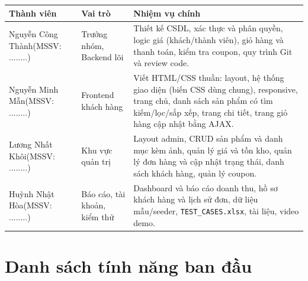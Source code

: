 \documentclass[12pt,a4paper]{article}   %
\newcommand{\MemberA}{Nguyễn Công Thành\newline (MSSV: ........)}
\newcommand{\MemberB}{Nguyễn Minh Mẫn\newline (MSSV: ........)}
\newcommand{\MemberC}{Lương Nhất Khôi\newline (MSSV: ........)}
\newcommand{\MemberD}{Huỳnh Nhật Hòa\newline (MSSV: ........)}
\begin{document}
\begin{tabularx}{\linewidth}{|L{3.3cm}|L{2.7cm}|Y|}
\hline
{} \textbf{Thành viên} & \textbf{Vai trò} & \textbf{Nhiệm vụ chính} \\ \hline \endhead
\MemberA & Trưởng nhóm, Backend lõi & Thiết kế CSDL, xác thực và phân quyền, logic giá (khách/thành viên),
          giỏ hàng và thanh toán, kiểm tra coupon, quy trình Git và review code. \\ \hline
\MemberB & Frontend khách hàng & Viết HTML/CSS thuần: layout, hệ thống giao diện (biến CSS dùng chung),
          responsive, trang chủ, danh sách sản phẩm có
          tìm kiếm/lọc/sắp xếp, trang chi tiết, trang giỏ hàng cập nhật bằng AJAX. \\ \hline
\MemberC & Khu vực quản trị & Layout admin, CRUD sản phẩm và danh mục kèm ảnh, quản lý giá và tồn kho,
          quản lý đơn hàng và cập nhật trạng thái, danh sách khách hàng, quản lý coupon. \\ \hline
\MemberD & Báo cáo, tài khoản, kiểm thử & Dashboard và báo cáo doanh thu, hồ sơ khách hàng và lịch sử đơn,
          dữ liệu mẫu/seeder, \texttt{TEST\_CASES.xlsx}, tài liệu, video demo. \\ \hline
\end{tabularx}

\section{Danh sách tính năng ban đầu}
\end{document}
